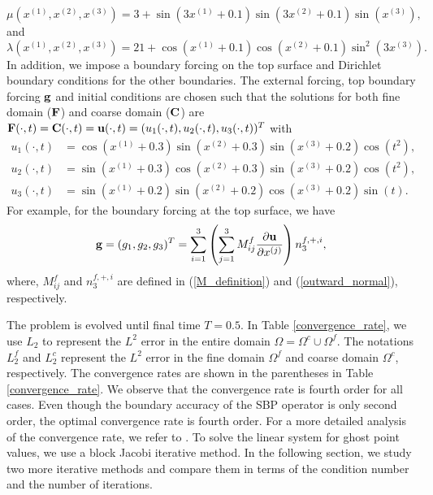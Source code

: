 \begin{equation*}\label{mu_function}
\mu(x^{(1)},x^{(2)},x^{(3)}) = 3 + \sin(3x^{(1)}+0.1)\sin(3x^{(2)}+0.1)\sin(x^{(3)}),
\end{equation*}
and 
\begin{equation*}\label{lambda_function}
\lambda(x^{(1)},x^{(2)},x^{(3)})  = 21+ \cos(x^{(1)}+0.1)\cos(x^{(2)}+0.1)\sin^2(3x^{(3)}).
\end{equation*}
 In addition, we impose a boundary forcing on the top surface and Dirichlet boundary conditions for the other boundaries. The external forcing, top boundary forcing ${\bf g}$ and initial conditions are chosen such that the solutions for both fine domain ($\bf F$) and coarse domain ($\bf C$) are ${\bf F}(\cdot,t) = {\bf C}(\cdot,t) = {\bf u}(\cdot,t) = (u_1(\cdot,t),u_2(\cdot,t),u_3(\cdot,t))^T$ with
\begin{align*}
u_1(\cdot,t) &= \cos(x^{(1)}+0.3)\sin(x^{(2)}+0.3)\sin(x^{(3)}+0.2)\cos(t^2),\\
u_2(\cdot,t) &= \sin(x^{(1)}+0.3)\cos(x^{(2)}+0.3)\sin(x^{(3)}+0.2)\cos(t^2),\\
u_3(\cdot,t) &= \sin(x^{(1)}+0.2)\sin(x^{(2)}+0.2)\cos(x^{(3)}+0.2)\sin(t).
\end{align*}
For example, for the boundary forcing at the top surface, we have 
\begin{equation*}\label{traction_force}
{\bf g} = (g_1,g_2,g_3)^T = \sum_{i=1}^3\left(\sum_{j = 1}^3 M_{ij}^f\frac{\partial{\bf u}}{\partial x^{(j)}}\right) n^{f,+,i}_3,
\end{equation*}
where, $M_{ij}^f$ and $n^{f,+,i}_3$ are defined in (\ref{M_definition}) and (\ref{outward_normal}), respectively.

The problem is evolved until final time $T = 0.5$. In Table \ref{convergence_rate}, we use $L_2$ to represent the $L^2$ error in the entire domain $\Omega = \Omega^c\cup\Omega^f$. The notations $L_2^f$ and $L_2^c$ represent the $L^2$ error in the fine domain $\Omega^f$ and coarse domain $\Omega^c$, respectively. The convergence rates are shown in the parentheses in Table \ref{convergence_rate}. We observe that the convergence rate is fourth order for all cases. Even though the boundary accuracy of the SBP operator is only second order, the optimal convergence rate is fourth order. For a more detailed analysis of the convergence rate, we refer to \cite{Wang2017, Wang2018b}.  To solve the linear system for ghost point values, we use a block Jacobi iterative method. In the following section, we study two more iterative methods and compare them in terms of the condition number and the number of iterations.


